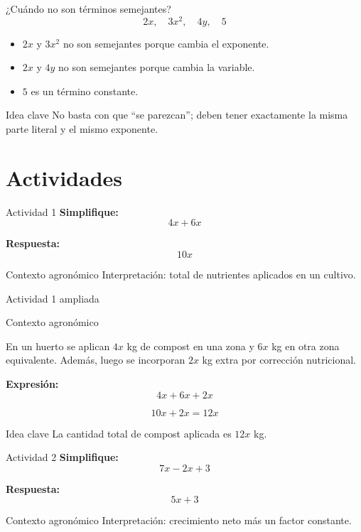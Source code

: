 \documentclass[handout,aspectratio=169,12pt]{beamer}
\newcommand{\IdeaClave}[1]{
	\begin{alertblock}{Idea clave}
		#1
	\end{alertblock}
}
\newcommand{\Agronomia}[1]{
	\begin{exampleblock}{Contexto agronómico}
		#1
	\end{exampleblock}
}
\begin{document}
	\begin{frame}{¿Cuándo no son términos semejantes?}
		\[
		2x,\quad 3x^2,\quad 4y,\quad 5
		\]
		
		\pause
		\begin{itemize}
			\item \(2x\) y \(3x^2\) no son semejantes porque cambia el exponente.
			\pause
			\item \(2x\) y \(4y\) no son semejantes porque cambia la variable.
			\pause
			\item \(5\) es un término constante.
		\end{itemize}
		
		\pause
		\IdeaClave{No basta con que “se parezcan”; deben tener exactamente la misma parte literal y el mismo exponente.}
	\end{frame}
	
	\section{Actividades}
	\begin{frame}{Actividad 1}
		\textbf{Simplifique:}
		\[
		4x+6x
		\]
		
		\pause
		\textbf{Respuesta:}
		\[
		10x
		\]
		
		\pause
		\Agronomia{Interpretación: total de nutrientes aplicados en un cultivo.}
	\end{frame}
	
	\begin{frame}{Actividad 1 ampliada}
		\Agronomia{
			En un huerto se aplican \(4x\) kg de compost en una zona y \(6x\) kg en otra zona equivalente. Además, luego se incorporan \(2x\) kg extra por corrección nutricional.
		}
		
		\pause
		\textbf{Expresión:}
		\[
		4x+6x+2x
		\]
		
		\pause
		\[
		10x+2x=12x
		\]
		
		\pause
		\IdeaClave{La cantidad total de compost aplicada es \(12x\) kg.}
	\end{frame}
	
	\begin{frame}{Actividad 2}
		\textbf{Simplifique:}
		\[
		7x-2x+3
		\]
		
		\pause
		\textbf{Respuesta:}
		\[
		5x+3
		\]
		
		\pause
		\Agronomia{Interpretación: crecimiento neto más un factor constante.}
	\end{frame}
	
\end{document}
